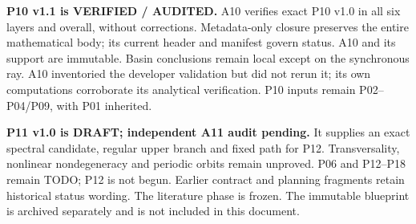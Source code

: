 \documentclass[11pt]{article}
\begin{document}
\smallskip\noindent\textbf{P10 v1.1 is VERIFIED / AUDITED.}
A10 verifies exact P10 v1.0 in all six layers and overall, without corrections.
Metadata-only closure preserves the entire mathematical body; its current
header and manifest govern status. A10 and its support are immutable.
Basin conclusions remain local except on the synchronous ray. A10
inventoried the developer validation but did not rerun it; its own
computations corroborate its analytical verification. P10 inputs remain
P02--P04/P09, with P01 inherited.

\smallskip\noindent\textbf{P11 v1.0 is DRAFT; independent A11 audit pending.}
It supplies an exact spectral candidate, regular upper branch and fixed
path for P12. Transversality, nonlinear nondegeneracy and periodic orbits
remain unproved. P06 and P12--P18 remain TODO; P12 is not begun.
Earlier contract and planning fragments retain historical status wording.
The literature phase is frozen. The immutable blueprint is archived
separately and is not included in this document.
\endgroup
\clearpage
\tableofcontents
\clearpage




\clearpage

\clearpage

\clearpage

\clearpage

\clearpage

\clearpage

\clearpage

\clearpage

\clearpage

\clearpage

\clearpage

\clearpage

\clearpage

\clearpage

\clearpage

\clearpage

\clearpage

\clearpage

\clearpage
\appendix




\end{document}
